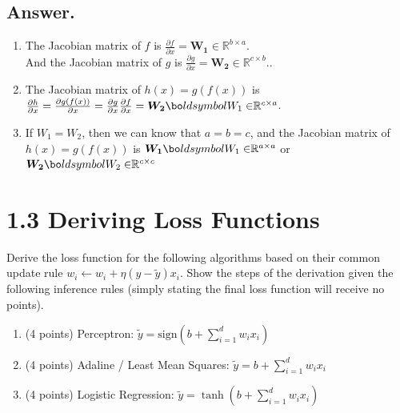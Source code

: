\documentclass{article}
\begin{document}
\begin{itemize}
    \subsection*{Answer.}
    \begin{enumerate}
        \item The Jacobian matrix of \(f\) is \(\frac{\partial f}{\partial x} = \boldsymbol{{W_1} \in} \mathbb{R}^{b \times a}\).\\
        And the Jacobian matrix of \(g\) is \(\frac{\partial g}{\partial x} = \boldsymbol{{W_2} \in} \mathbb{R}^{c \times b}\)..
        \item The Jacobian matrix of \(h(x) = g(f(x))\) is \(\frac{\partial h}{\partial x} = \frac{\partial g(f(x))}{\partial x} = \frac{\partial g}{\partial x} \frac{\partial f}{\partial x} = \boldsymbol{{W_2} \bo}ldsymbol{{W_1} \in} \mathbb{R}^{c \times a}\).
        \item If \(W_1 = W_2\), then we can know that \(a = b = c\), and the Jacobian matrix of \(h(x) = g(f(x))\) is \(\boldsymbol{{W_1} \bo}ldsymbol{{W_1} \in} \mathbb{R}^{a \times a}\) or \(\boldsymbol{{W_2} \bo}ldsymbol{{W_2} \in} \mathbb{R}^{c \times c}\)
    \end{enumerate}



\end{itemize}

\section*{1.3 Deriving Loss Functions}

Derive the loss function for the following algorithms based on their common update rule $w_i \leftarrow w_i + \eta (y - \tilde{y}) x_i$. Show the steps of the derivation given the following inference rules (simply stating the final loss function will receive no points).

\begin{enumerate}
    \item (4 points) Perceptron: $\tilde{y} = \text{sign}(b + \sum_{i=1}^{d} w_i x_i)$
    \item (4 points) Adaline / Least Mean Squares: $\tilde{y} = b + \sum_{i=1}^{d} w_i x_i$
    \item (4 points) Logistic Regression: $\tilde{y} = \tanh(b + \sum_{i=1}^{d} w_i x_i)$
\end{enumerate}

\end{document}
